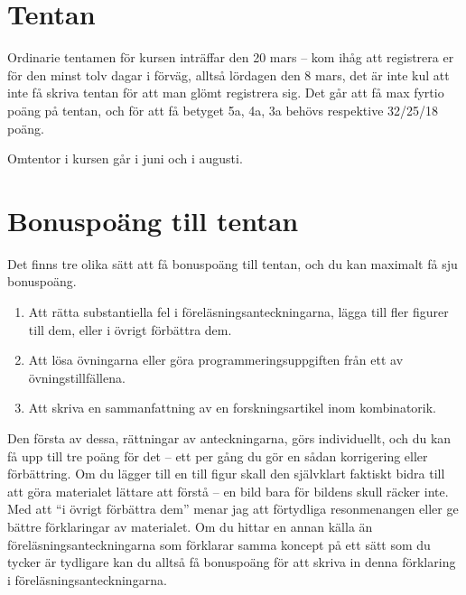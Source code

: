 \documentclass[nobib]{tufte-handout}
\begin{document}
\section{Tentan}

Ordinarie tentamen för kursen inträffar den 20 mars -- kom ihåg att registrera er för den minst tolv dagar i förväg, alltså lördagen den 8 mars, det är inte kul att inte få skriva tentan för att man glömt registrera sig. Det går att få max fyrtio poäng på tentan, och för att få betyget 5a, 4a, 3a behövs respektive 32/25/18 poäng.

Omtentor i kursen går i juni och i augusti.

\section{Bonuspoäng till tentan}

Det finns tre olika sätt att få bonuspoäng till tentan, och du kan maximalt få sju bonuspoäng.

\begin{enumerate}
	\item Att rätta substantiella fel i föreläsningsanteckningarna, lägga till fler figurer till dem, eller i övrigt förbättra dem.
	\item Att lösa övningarna eller göra programmeringsuppgiften från ett av övningstillfällena.
	\item Att skriva en sammanfattning av en forskningsartikel inom kombinatorik.
\end{enumerate}

Den första av dessa, rättningar av anteckningarna, görs individuellt, och du kan få upp till tre poäng för det -- ett per gång du gör en sådan korrigering eller förbättring. Om du lägger till en till figur skall den självklart faktiskt bidra till att göra materialet lättare att förstå -- en bild bara för bildens skull räcker inte. Med att ``i övrigt förbättra dem'' menar jag att förtydliga resonmenangen eller ge bättre förklaringar av materialet. Om du hittar en annan källa än föreläsningsanteckningarna som förklarar samma koncept på ett sätt som du tycker är tydligare kan du alltså få bonuspoäng för att skriva in denna förklaring i föreläsningsanteckningarna.
\end{document}
